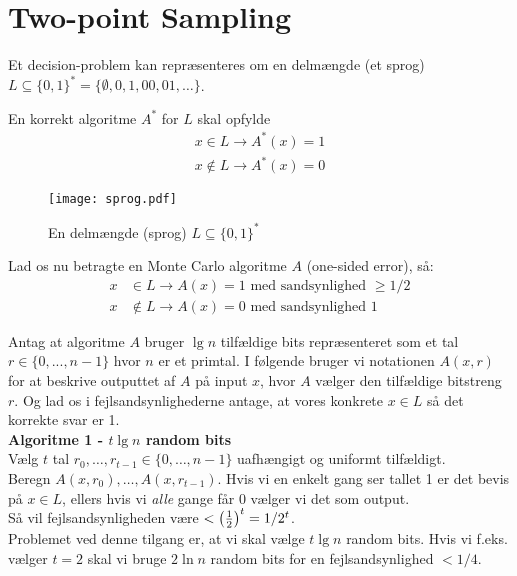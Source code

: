 \section{Two-point Sampling}
Et decision-problem kan repræsenteres om en delmængde (et sprog) $L \subseteq \{0, 1\}^\ast = \{\emptyset, 0, 1, 00, 01, \dots \}$.

En korrekt algoritme $A^\ast$ for $L$ skal opfylde
\begin{align*}
  x \in L \rightarrow A^\ast(x) = 1\\
  x \notin L \rightarrow A^\ast(x) = 0
\end{align*}

\begin{figure}[H]
  \begin{center}
  \texttt{[image: sprog.pdf]}
  \end{center}
  \caption{En delmængde (sprog) $L \subseteq \{0, 1\}^\ast$}
  \label{fig:sprog}
\end{figure}

Lad os nu betragte en Monte Carlo algoritme $A$ (one-sided error), så:
\begin{align*}
  x &\in L \rightarrow A(x) = 1 \text{ med sandsynlighed $\geq 1/2$}\\
  x &\notin L \rightarrow A(x) = 0 \text{ med sandsynlighed $1$}
\end{align*}

Antag at algoritme $A$ bruger $\lg n$ tilfældige bits repræsenteret som et tal $r \in \{0, ..., n-1 \}$ hvor $n$ er et primtal. I følgende bruger vi notationen $A(x, r)$ for at beskrive outputtet af $A$ på input $x$, hvor $A$ vælger den tilfældige bitstreng $r$. Og lad os i fejlsandsynlighederne antage, at vores konkrete $x \in L$ så det korrekte svar er 1.\\

\textbf{Algoritme 1 - $t \lg n$ random bits}\\
Vælg $t$ tal $r_0, \dots, r_{t-1} \in \{0, \dots, n-1\}$ uafhængigt og uniformt tilfældigt.\\
Beregn $A(x, r_0), \dots, A(x, r_{t-1})$. Hvis vi en enkelt gang ser tallet 1 er det bevis på $x \in L$, ellers hvis vi \emph{alle} gange får 0 vælger vi det som output.\\

Så vil fejlsandsynligheden være $< \left(  \frac{1}{2}  \right)^t = 1/2^t$.\\

Problemet ved denne tilgang er, at vi skal vælge $t \lg n$ random bits. Hvis vi f.eks. vælger $t = 2$ skal vi bruge $2 \ln n$ random bits for en fejlsandsynlighed $< 1/4$.\\


